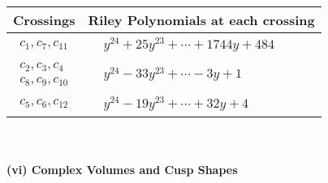 \documentclass[1p]{elsarticle_modified}
\theoremstyle{definition}
\begin{document}
\begin{tabular}{m{50pt}|m{274pt}}
Crossings & \hspace{64pt}Riley Polynomials at each crossing \\
\hline $$\begin{aligned}c_{1},c_{7},c_{11}\end{aligned}$$&$\begin{aligned}
&y^{24}+25 y^{23}+\cdots+1744 y+484
\end{aligned}$\\
\hline $$\begin{aligned}c_{2},c_{3},c_{4}\\c_{8},c_{9},c_{10}\end{aligned}$$&$\begin{aligned}
&y^{24}-33 y^{23}+\cdots-3 y+1
\end{aligned}$\\
\hline $$\begin{aligned}c_{5},c_{6},c_{12}\end{aligned}$$&$\begin{aligned}
&y^{24}-19 y^{23}+\cdots+32 y+4
\end{aligned}$\\
\hline
\end{tabular}\\~\\
\newpage\flushleft \textbf{(vi) Complex Volumes and Cusp Shapes}
\end{document}
